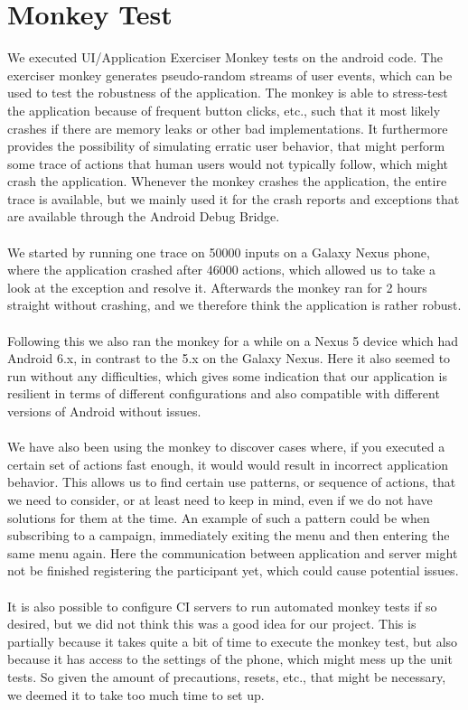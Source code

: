 
\section{Monkey Test}
\label{sec:monkey_test}
We executed UI/Application Exerciser Monkey tests on the android code. The exerciser monkey generates pseudo-random streams of user events, which can be used to test the robustness of the application. The monkey is able to stress-test the application because of frequent button clicks, etc., such that it most likely crashes if there are memory leaks or other bad implementations. It furthermore provides the possibility of simulating erratic user behavior, that might perform some trace of actions that human users would not typically follow, which might crash the application. Whenever the monkey crashes the application, the entire trace is available, but we mainly used it for the crash reports and exceptions that are available through the Android Debug Bridge. 
\\\\
We started by running one trace on 50000 inputs on a Galaxy Nexus phone, where the application crashed after 46000 actions, which allowed us to take a look at the exception and resolve it. Afterwards the monkey ran for 2 hours straight without crashing, and we therefore think the application is rather robust.
\\\\
Following this we also ran the monkey for a while on a Nexus 5 device which had Android 6.x, in contrast to the 5.x on the Galaxy Nexus. Here it also seemed to run without any difficulties, which gives some indication that our application is resilient in terms of different configurations and also compatible with different versions of Android without issues.
\\\\
We have also been using the monkey to discover cases where, if you executed a certain set of actions fast enough, it would would result in incorrect application behavior. This allows us to find certain use patterns, or sequence of actions, that we need to consider, or at least need to keep in mind, even if we do not have solutions for them at the time. An example of such a pattern could be when subscribing to a campaign, immediately exiting the menu and then entering the same menu again. Here the communication between application and server might not be finished registering the participant yet, which could cause potential issues.
\\\\
It is also possible to configure CI servers to run automated monkey tests if so desired, but we did not think this was a good idea for our project. This is partially because it takes quite a bit of time to execute the monkey test, but also because it has access to the settings of the phone, which might mess up the unit tests. So given the amount of precautions, resets, etc., that might be necessary, we deemed it to take too much time to set up. 

